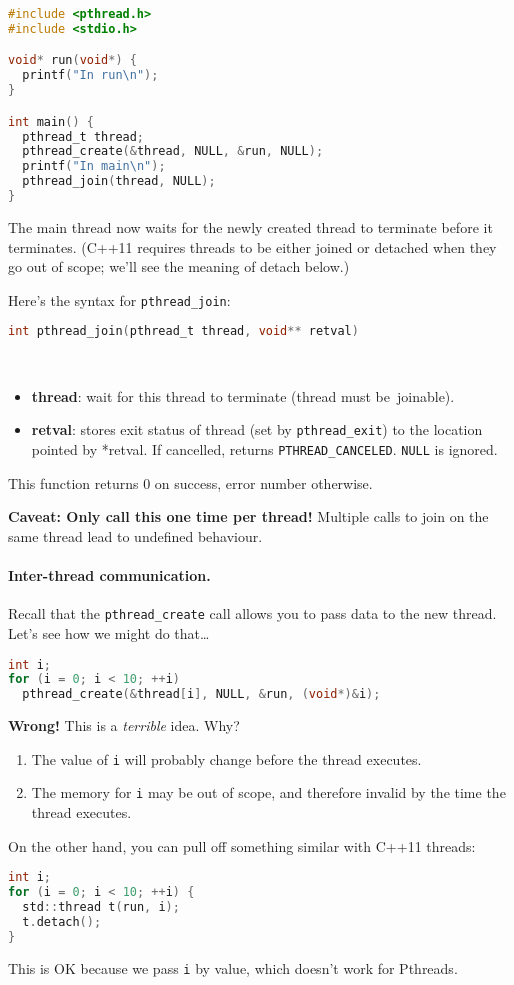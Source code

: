 \begin{lstlisting}[language=C]
#include <pthread.h>
#include <stdio.h>

void* run(void*) {
  printf("In run\n");
}

int main() {
  pthread_t thread;
  pthread_create(&thread, NULL, &run, NULL);
  printf("In main\n");
  pthread_join(thread, NULL);
}
\end{lstlisting}

The main thread now waits for the newly created thread to terminate
before it terminates. (C++11 requires threads to be either joined or
detached when they go out of scope; we'll see the meaning of detach below.)

Here's the syntax for {\tt pthread\_join}:

\begin{lstlisting}[language=C]
int pthread_join(pthread_t thread, void** retval)
\end{lstlisting}
~\vspace*{-3em}
\begin{itemize}
\item  {\bf thread}: wait for this thread to terminate (thread must be~joinable).

\item  {\bf retval}: stores exit status of thread (set by {\tt pthread\_exit}) to
                 the location pointed by *retval. If cancelled, returns
                 {\tt PTHREAD\_CANCELED}. {\tt NULL} is ignored.
\end{itemize}

This function returns 0 on success, error number otherwise.

 {\bf Caveat: Only call this one time per thread!} Multiple calls to join on the same thread
  lead to undefined behaviour.

\paragraph{Inter-thread communication.} Recall that the {\tt pthread\_create} 
call allows you to pass data to the new thread. Let's see how we might do that\ldots

\begin{lstlisting}[language=C]
int i;
for (i = 0; i < 10; ++i)
  pthread_create(&thread[i], NULL, &run, (void*)&i);
\end{lstlisting}

{\bf Wrong!} This is a \emph{terrible} idea. Why?
\begin{enumerate}
    \item The value of {\tt i} will probably change before the thread executes.
    \item The memory for {\tt i} may be out of scope, and therefore invalid by
          the time the thread executes.
\end{enumerate}
On the other hand, you can pull off something similar with C++11 threads:
\begin{lstlisting}[language=C]
int i;
for (i = 0; i < 10; ++i) {
  std::thread t(run, i);
  t.detach();
}
\end{lstlisting}
This is OK because we pass {\tt i} by value, which doesn't work for Pthreads.

